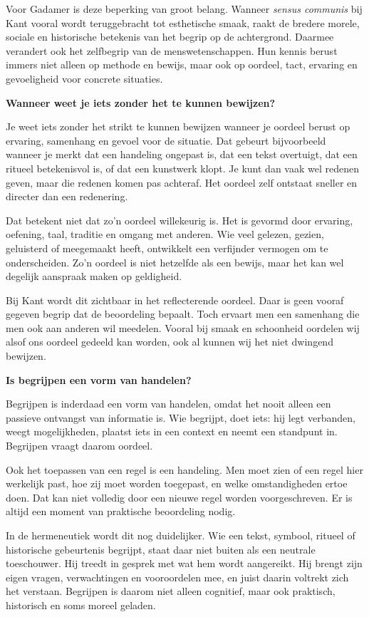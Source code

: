 \documentclass[11pt,twoside,openright]{memoir}
\begin{document}
Voor Gadamer is deze beperking van groot belang. Wanneer \textit{sensus communis} bij Kant vooral wordt teruggebracht tot esthetische smaak, raakt de bredere morele, sociale en historische betekenis van het begrip op de achtergrond. Daarmee verandert ook het zelfbegrip van de menswetenschappen. Hun kennis berust immers niet alleen op methode en bewijs, maar ook op oordeel, tact, ervaring en gevoeligheid voor concrete situaties.

\bigskip
\noindent
\textbf{Wanneer weet je iets zonder het te kunnen bewijzen?}
\medskip

Je weet iets zonder het strikt te kunnen bewijzen wanneer je oordeel berust op ervaring, samenhang en gevoel voor de situatie. Dat gebeurt bijvoorbeeld wanneer je merkt dat een handeling ongepast is, dat een tekst overtuigt, dat een ritueel betekenisvol is, of dat een kunstwerk klopt. Je kunt dan vaak wel redenen geven, maar die redenen komen pas achteraf. Het oordeel zelf ontstaat sneller en directer dan een redenering.

Dat betekent niet dat zo'n oordeel willekeurig is. Het is gevormd door ervaring, oefening, taal, traditie en omgang met anderen. Wie veel gelezen, gezien, geluisterd of meegemaakt heeft, ontwikkelt een verfijnder vermogen om te onderscheiden. Zo'n oordeel is niet hetzelfde als een bewijs, maar het kan wel degelijk aanspraak maken op geldigheid.

Bij Kant wordt dit zichtbaar in het reflecterende oordeel. Daar is geen vooraf gegeven begrip dat de beoordeling bepaalt. Toch ervaart men een samenhang die men ook aan anderen wil meedelen. Vooral bij smaak en schoonheid oordelen wij alsof ons oordeel gedeeld kan worden, ook al kunnen wij het niet dwingend bewijzen.

\bigskip
\noindent
\textbf{Is begrijpen een vorm van handelen?}
\medskip

Begrijpen is inderdaad een vorm van handelen, omdat het nooit alleen een passieve ontvangst van informatie is. Wie begrijpt, doet iets: hij legt verbanden, weegt mogelijkheden, plaatst iets in een context en neemt een standpunt in. Begrijpen vraagt daarom oordeel.

Ook het toepassen van een regel is een handeling. Men moet zien of een regel hier werkelijk past, hoe zij moet worden toegepast, en welke omstandigheden ertoe doen. Dat kan niet volledig door een nieuwe regel worden voorgeschreven. Er is altijd een moment van praktische beoordeling nodig.

In de hermeneutiek wordt dit nog duidelijker. Wie een tekst, symbool, ritueel of historische gebeurtenis begrijpt, staat daar niet buiten als een neutrale toeschouwer. Hij treedt in gesprek met wat hem wordt aangereikt. Hij brengt zijn eigen vragen, verwachtingen en vooroordelen mee, en juist daarin voltrekt zich het verstaan. Begrijpen is daarom niet alleen cognitief, maar ook praktisch, historisch en soms moreel geladen.
\end{document}

